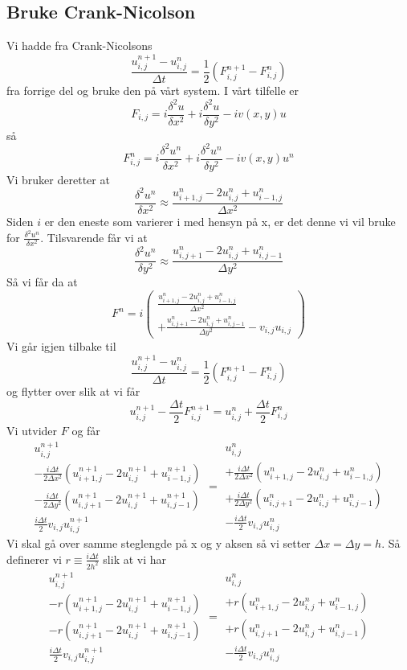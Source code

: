 \documentclass[reprint,english,notitlepage]{revtex4-2}  %
\begin{document}
\subsection{Bruke Crank-Nicolson}
Vi hadde fra Crank-Nicolsons
$$
\frac{u^{n+1}_{i,j}-u^n_{i,j}}{\Delta t}=\frac{1}{2}(F^{n+1}_{i,j}-F^{n}_{i,j})
$$
fra forrige del og bruke den på vårt system. \newline
I vårt tilfelle er 
$$
F_{i,j}=i\frac{\delta^2 u}{\delta x^2}+i\frac{\delta^2 u}{\delta y^2}-iv(x,y)u
$$
så 
$$
F^{n}_{i,j}=i\frac{\delta^2 u^n}{\delta x^2}+i\frac{\delta^2 u^n}{\delta y^2}-iv(x,y)u^n
$$
Vi bruker deretter at
$$
\frac{\delta^2 u^n}{\delta x^2}\approx\frac{u^{n}_{i+1,j}-2u^{n}_{i,j}+u^n_{i-1,j}}{\Delta x^2}
$$
Siden $i$ er den eneste som varierer i med hensyn på x, er det denne vi vil bruke for $\frac{\delta^2u^n}{\delta x^2}$. Tilsvarende får vi at
$$
\frac{\delta^2 u^n}{\delta y^2}\approx \frac{u^n_{i,j+1}-2u^n_{i,j}+u^{n}_{i,j-1}}{\Delta y^2}
$$
Så vi får da at
$$
F^n=i\begin{pmatrix}
\frac{u^{n}_{i+1,j}-2u^{n}_{i,j}+u^n_{i-1,j}}{\Delta x^2} \\ +\frac{u^n_{i,j+1}-2u^n_{i,j}+u^{n}_{i,j-1}}{\Delta y^2}-v_{i,j}u_{i,j}
\end{pmatrix}
$$
Vi går igjen tilbake til
$$
\frac{u^{n+1}_{i,j}-u^n_{i,j}}{\Delta t}=\frac{1}{2}(F^{n+1}_{i,j}-F^{n}_{i,j})
$$
og flytter over slik at vi får
$$
u^{n+1}_{i,j}-\frac{\Delta t}{2}F^{n+1}_{i,j}=u^{n}_{i,j}+\frac{\Delta t}{2}F^{n}_{i,j}
$$
Vi utvider $F$ og får
$$
\begin{matrix}
	u_{i,j}^{n+1} \\ -\frac{i\Delta t}{2\Delta x^2}(u^{n+1}_{i+1,j}-2u^{n+1}_{i,j}+u^{n+1}_{i-1,j}) \\ -\frac{i\Delta t}{2\Delta y^2}(u^{n+1}_{i,j+1}-2u^{n+1}_{i,j}+u^{n+1}_{i,j-1}) \\ \frac{i\Delta t}{2}v_{i,j}u^{n+1}_{i,j}
\end{matrix}=\begin{matrix}
u^n_{i,j}\\ +\frac{i\Delta t}{2\Delta x^2}(u^{n}_{i+1,j}-2u^{n}_{i,j}+u^{n}_{i-1,j}) \\ +\frac{i\Delta t}{2\Delta y^2}(u^n_{i,j+1}-2u^n_{i,j}+u^{n}_{i,j-1}) \\ -\frac{i\Delta t}{2}v_{i,j}u^n_{i,j} 
\end{matrix}
$$
Vi skal gå over samme steglengde på x og y aksen så vi setter $\Delta x=\Delta y=h$. Så definerer vi $r\equiv \frac{i\Delta t}{2h^2}$ slik at vi har
$$
\begin{matrix}
	u_{i,j}^{n+1} \\ 
	-r(u^{n+1}_{i+1,j}-2u^{n+1}_{i,j}+u^{n+1}_{i-1,j}) \\ -r(u^{n+1}_{i,j+1}-2u^{n+1}_{i,j}+u^{n+1}_{i,j-1}) \\ \frac{i\Delta t}{2}v_{i,j}u^{n+1}_{i,j}
\end{matrix}=\begin{matrix}
	u^n_{i,j}\\ +r(u^{n}_{i+1,j}-2u^{n}_{i,j}+u^{n}_{i-1,j}) \\ +r(u^n_{i,j+1}-2u^n_{i,j}+u^{n}_{i,j-1}) \\ -\frac{i\Delta t}{2}v_{i,j}u^n_{i,j} 
\end{matrix}
$$
\end{document}
